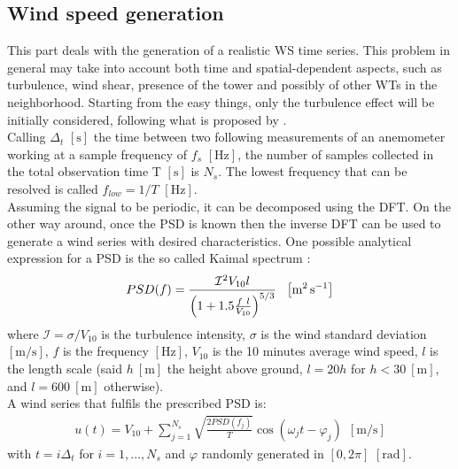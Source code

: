\subsection{Wind speed generation}
This part deals with the generation of a realistic \acrshort{WS} time series. This problem in general may take into account both time and spatial-dependent aspects, such as turbulence, wind shear, presence of the tower and possibly of other WTs in the neighborhood. Starting from the easy things, only the turbulence effect will be initially considered, following what is proposed by \cite{Aerodynamics_of_wind_turbines}. \\
Calling $\Delta_t$ $\left[\si{\second}\right]$ the time between two following measurements of an anemometer working at a sample frequency of $f_s$ $\left[\si{\hertz}\right]$, the number of samples collected in the total observation time T $\left[\si{\second}\right]$ is $N_s$. The lowest frequency that can be resolved is called $f_{low}=1/T$ $\left[\si{\hertz}\right]$. \\
Assuming the signal to be periodic, it can be decomposed using the \acrfull{DFT}. On the other way around, once the \acrfull{PSD} is known then the inverse \acrshort{DFT} can be used to generate a wind series with desired characteristics. One possible analytical expression for a \acrshort{PSD} is the so called Kaimal spectrum \cite{Aerodynamics_of_wind_turbines}:
\begin{equation}
    PSD(f) = \frac{\mathcal{I} ^2V_{10}l}{\left(1+1.5\frac{f \ l}{V_{10}}\right)^{5/3}} \ \ \mesunt{\square \meter \per \second}
    \label{eq:PSD}
\end{equation}
where $\mathcal{I} =\sigma/V_{10}$ is the turbulence intensity, $\sigma$ is the wind standard deviation $\left[\si{\meter\per\second}\right]$, $f$ is the frequency $\left[\si{\hertz}\right]$, $V_{10}$ is the 10 minutes average wind speed, $l$ is the length scale (said $h \ \left[\si{\meter}\right]$ the height above ground, $l=20h$ for $h<30 \ \left[\si{\meter}\right]$, and  $l=600 \ \left[\si{\meter}\right]$ otherwise).\\
A wind series that fulfils the prescribed \acrshort{PSD} is:
\begin{gather}
    u(t) = V_{10}+\sum_{j=1}^{N_s}\sqrt{\frac{2PSD(f_j)}{T}}\cos{(\omega_jt-\varphi_j)} \ \ \left[\si{\meter \per \second}\right]
    \label{eq:wind_series}
\end{gather}
with $t = i\Delta_t$ for $i=1,\dots,N_s$ and $\varphi$ randomly generated in $ \left[0, 2\pi\right]$ $\left[\si{\radian}\right]$. \\
